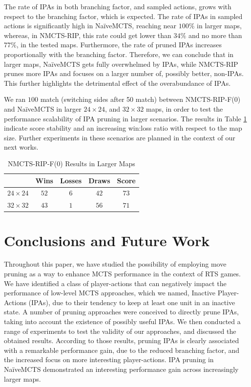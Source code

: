 \documentclass[conference]{IEEEtran}
\begin{document}
The rate of IPAs in both branching factor, and sampled actions, grows with respect to the branching factor, which is expected. The rate of IPAs in sampled actions is significantly high in NaïveMCTS, reaching near $100\%$ in larger maps, whereas, in NMCTS-RIP, this rate could get lower than $34\%$ and no more than $77\%$, in the tested maps. Furthermore, the rate of pruned IPAs increases proportionally with the branching factor. Therefore, we can conclude that in larger maps, NaïveMCTS gets fully overwhelmed by IPAs, while NMCTS-RIP prunes more IPAs and focuses on a larger number of, possibly better, non-IPAs. This further highlights the detrimental effect of the overabundance of IPAs.

We ran $100$ match (switching sides after 50 match) between NMCTS-RIP-F($0$) and NaïveMCTS in larger $24\times24$, and $32\times32$ maps, in order to test the performance scalability of IPA pruning in larger scenarios. The results in Table \ref{largeMaps} indicate score stability and an increasing win:loss ratio with respect to the map size. Further experiments in these scenarios are planned in the context of our next works.

\begin{table}[!t]
\renewcommand{\arraystretch}{1.3}
\centering
\label{largeMaps}
\caption{NMCTS-RIP-F($0$) Results in Larger Maps}
\begin{tabular}{c|c|c|c|c} 
\cline{2-5}
\multicolumn{1}{c|}{} & Wins & Losses & Draws & Score  \\ 
\hline \hline
$24\times24$ & $52$ & $6$ & $42$ & $73$ \\
$32\times32$ & $43$ & $1$ & $56$ & $71$ \\
\hline
\end{tabular}
\end{table}


\section{Conclusions and Future Work}
\label{sec:conclusions}

Throughout this paper, we have studied the possibility of employing move pruning as a way to enhance MCTS performance in the context of RTS games. We have identified a class of player-actions that can negatively impact the performance of low-level MCTS approaches, which we named, Inactive Player-Actions (IPAs), due to their tendency to keep at least one unit in an inactive state. A number of pruning approaches were conceived to directly prune IPAs, taking into account the existence of possibly useful IPAs. We then conducted a range of experiments to test the validity of our approaches, and discussed the obtained results. According to those results, pruning IPAs is clearly associated with a remarkable performance gain, due to the reduced branching factor, and the increased focus on more interesting player-actions. IPA pruning in NaïveMCTS demonstrated an interesting performance gain across increasingly larger maps.
\end{document}
